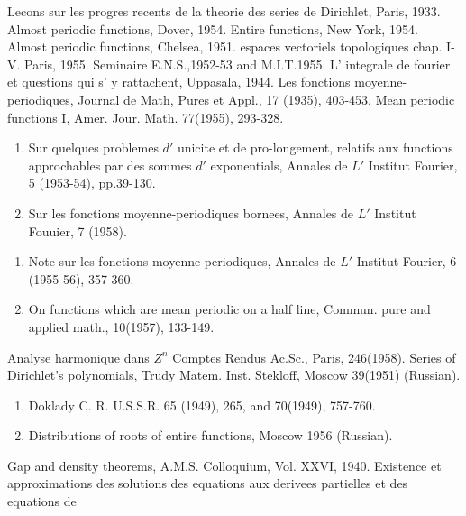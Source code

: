\begin{thebibliography}{99}
\pageoriginale Lecons sur les progres recents
  de la theorie des series de Dirichlet, Paris, 1933. 
 Almost periodic functions, Dover, 1954.
 Entire functions, New York, 1954.
 Almost periodic functions, Chelsea, 1951.
 espaces vectoriels topologiques chap. I-V. Paris, 1955.
 Seminaire E.N.S.,1952-53 and M.I.T.1955.
 L' integrale de fourier et questions qui
 s' y rattachent, Uppasala, 1944. 
 Les fonctions moyenne- periodiques, Journal
 de Math, Pures et Appl., 17 (1935), 403-453. 
 Mean periodic functions I,
 Amer. Jour. Math. 77(1955), 293-328. 
 \begin{enumerate}
 \item Sur quelques problemes $d'$ unicite et de pro-longement,
 relatifs aux functions approchables par des sommes $d'$
 exponentials, Annales de $L'$ Institut Fourier, 5 (1953-54),
 pp.39-130. 
 \item Sur les fonctions moyenne-periodiques bornees, Annales de $L'$
 Institut Fouuier, 7 (1958). 
 \end{enumerate}
 \begin{enumerate}
 \item Note sur les fonctions moyenne periodiques, Annales de $L'$
 Institut Fourier, 6 (1955-56), 357-360. 
 \item On functions which are mean periodic on a half line,
 Commun. pure and applied math., 10(1957), 133-149. 
 \end{enumerate}
\pageoriginale Analyse harmonique dans $Z^n$ Comptes Rendus
 Ac.Sc., Paris, 246(1958). 
 Series of Dirichlet's polynomials, Trudy
 Matem. Inst. Stekloff, Moscow 39(1951) (Russian). 
 \begin{enumerate}
 \item Doklady C. R. U.S.S.R. 65 (1949), 265, and 70(1949), 757-760.
 \item Distributions of roots of entire functions, Moscow 1956 (Russian).
 \end{enumerate}
 Gap and density theorems,
 A.M.S. Colloquium, Vol. XXVI, 1940. 
 Existence et approximations des solutions
 des equations aux derivees partielles et des equations de

\end{thebibliography}
